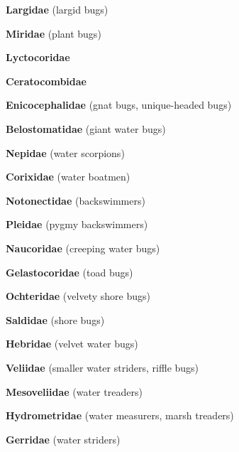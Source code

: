 \documentclass[letterpaper,10pt]{article}
\begin{document}
{\makebox[0.6cm]{}  \textbf{Largidae} (largid bugs) \par
\makebox[0.6cm]{}  \textbf{Miridae} (plant bugs) \par
\makebox[0.6cm]{}  \textbf{Lyctocoridae} \par
\makebox[0.6cm]{}  \textbf{Ceratocombidae} \par
\makebox[0.6cm]{}  \textbf{Enicocephalidae} (gnat bugs, unique-headed bugs) \par
\makebox[0.6cm]{}  \textbf{Belostomatidae} (giant water bugs) \par
\makebox[0.6cm]{}  \textbf{Nepidae} (water scorpions) \par
\makebox[0.6cm]{}  \textbf{Corixidae} (water boatmen)\par
\makebox[0.6cm]{}  \textbf{Notonectidae} (backswimmers) \par
\makebox[0.6cm]{}  \textbf{Pleidae} (pygmy backswimmers) \par
\makebox[0.6cm]{}  \textbf{Naucoridae} (creeping water bugs) \par
\makebox[0.6cm]{}  \textbf{Gelastocoridae} (toad bugs) \par
\makebox[0.6cm]{}  \textbf{Ochteridae} (velvety shore bugs) \par
\makebox[0.6cm]{}  \textbf{Saldidae} (shore bugs) \par
\makebox[0.6cm]{}  \textbf{Hebridae} (velvet water bugs) \par
\makebox[0.6cm]{}  \textbf{Veliidae} (smaller water striders, riffle bugs) \par
\makebox[0.6cm]{}  \textbf{Mesoveliidae} (water treaders) \par
\makebox[0.6cm]{}  \textbf{Hydrometridae} (water measurers, marsh treaders) \par
\makebox[0.6cm]{}  \textbf{Gerridae} (water striders) \par

}
\end{document}
